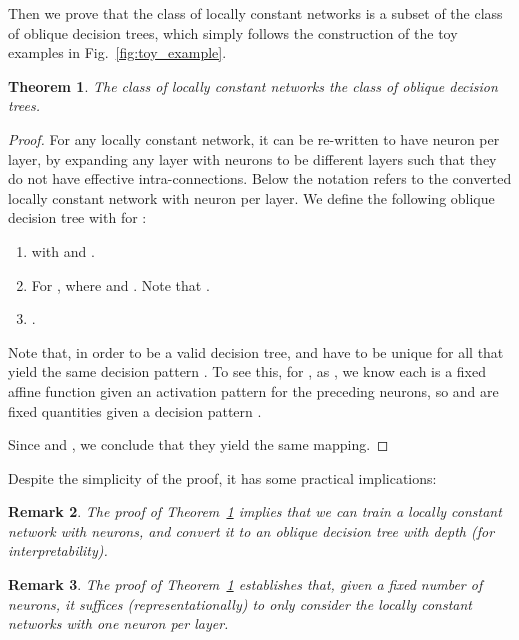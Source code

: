 \documentclass{article} \usepackage{iclr2020_conference,times}
\newtheorem{theorem}{Theorem}\newtheorem{definition}[theorem]{Definition}
\newtheorem{remark}[theorem]{Remark}
\begin{document}
\vspace{-2mm}
Then we prove that the class of locally constant networks is a subset of the class of oblique decision trees, which simply follows the construction of the toy examples in Fig.~\ref{fig:toy_example}. 
\begin{theorem}
The class of locally constant networks  the class of oblique decision trees. \label{theorem:convert}
\end{theorem}
\vspace{-2mm}
\begin{proof}
\vspace{-2mm}
For any locally constant network, it can be re-written to have  neuron per layer, by expanding any layer with  neurons to be  different layers such that they do not have effective intra-connections. 
Below the notation refers to the converted locally constant network with  neuron per layer. 
We define the following oblique decision tree with  for :
\begin{enumerate}
\vspace{-2mm}
    \item  with  and .\!\!\!\!
\vspace{-1mm}
    \item For , where  and . Note that .
\vspace{-1mm}
    \item .
\vspace{-2mm}
\end{enumerate}
Note that, in order to be a valid decision tree,  and  have to be unique for all  that yield the same decision pattern . To see this, for , as , we know each  is a fixed affine function given an activation pattern for the preceding neurons, so  and  are fixed quantities given a decision pattern . 

Since  and , we conclude that they yield the same mapping. 
\end{proof}
\vspace{-2mm}
Despite the simplicity of the proof, it has some practical implications:
\begin{remark}\label{remark:equivalence}
The proof of Theorem~\ref{theorem:convert} implies that we can train a locally constant network with  neurons, and convert it to an oblique decision tree with depth  (for interpretability).
\vspace{-1mm}
\end{remark}
\begin{remark}
The proof of Theorem~\ref{theorem:convert} establishes that, given a fixed number of neurons, it suffices (representationally) to only consider the locally constant networks with one neuron per layer. 
\label{remark:one-neuron}
\end{remark}
\end{document}
